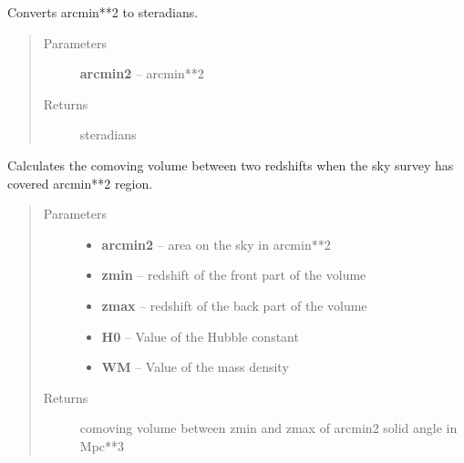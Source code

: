\documentclass[letterpaper,10pt,english]{sphinxmanual}
\begin{document}
\begin{fulllineitems}
\label{SamPy.astronomy:SamPy.astronomy.conversions.arcminSquaredToSteradians}
Converts arcmin**2 to steradians.
\begin{quote}\begin{description}
\item[{Parameters}] \leavevmode
\textbf{arcmin2} -- arcmin**2

\item[{Returns}] \leavevmode
steradians

\end{description}\end{quote}

\end{fulllineitems}



\begin{fulllineitems}
\label{SamPy.astronomy:SamPy.astronomy.conversions.comovingVolume}
Calculates the comoving volume between two redshifts when
the sky survey has covered arcmin**2 region.
\begin{quote}\begin{description}
\item[{Parameters}] \leavevmode\begin{itemize}
\item {} 
\textbf{arcmin2} -- area on the sky in arcmin**2

\item {} 
\textbf{zmin} -- redshift of the front part of the volume

\item {} 
\textbf{zmax} -- redshift of the back part of the volume

\item {} 
\textbf{H0} -- Value of the Hubble constant

\item {} 
\textbf{WM} -- Value of the mass density

\end{itemize}

\item[{Returns}] \leavevmode
comoving volume between zmin and zmax of arcmin2
solid angle in Mpc**3

\end{description}\end{quote}

\end{fulllineitems}
\end{document}

